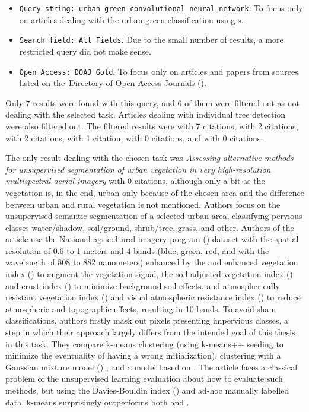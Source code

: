 \begin{itemize}
	\item \verb|Query string: urban green convolutional neural network|. To focus only on articles dealing with the urban green classification using s.
	\item \verb|Search field: All Fields|. Due to the small number of results, a more restricted query did not make sense.
	\item \verb|Open Access: DOAJ Gold|. To focus only on articles and papers from sources listed on the~Di\-rectory of Open Access Journals ().
\end{itemize}

\noindent Only 7 results were found with this query, and 6 of them were filtered out as not dealing with the selected task. Articles dealing with individual tree detection were also filtered out. The filtered results were \cite{tree-detection-uav-cnn} with 7 citations, \cite{cascaded-cnn-trees} with 2 citations, \cite{window-zooming-fruit} with 2 citations, \cite{urban-green-quantification} with 1 citation, \cite{urban-green-obesity} with 0 citations, and \cite{urban-green-contamination} with 0 citations.

The only result dealing with the chosen task was \textit{Assessing alternative methods for unsupervised segmentation of urban vegetation in very high-resolution multispectral aerial imagery} \cite{urban-green-unsupervised-aerial} with 0 citations, although only a bit as the vegetation is, in the end, urban only because of the chosen area and the difference between urban and rural vegetation is not mentioned. Authors focus on the unsupervised semantic segmentation of a selected urban area, classifying pervious classes water/shadow, soil/ground, shrub/tree, grass, and other. Authors of the article use the National agricultural imagery program () dataset with the spatial resolution of 0.6 to 1 meters and 4 bands (blue, green, red, and  with the wavelength of 808 to 882 nanometers) enhanced by the  and enhanced vegetation index () to augment the vegetation signal, the soil adjusted vegetation index () and crust index () to minimize background soil effects, and atmospherically resistant vegetation index () and visual atmospheric resistance index () to reduce atmospheric and topographic effects, resulting in 10 bands. To avoid sham classifications, authors firstly mask out pixels presenting impervious classes, a step in which their approach largely differs from the intended goal of this thesis in this task. They compare k-means clustering \cite{k-means} (using k-means++ seeding \cite{k-means-plusplus} to minimize the eventuality of having a wrong initialization), clustering with a Gaussian mixture model () \cite{gmm}, and a  model based on \cite{cnn-hs-unsupervised-fuzzy}. The article faces a classical problem of the unsupervised learning evaluation about how to evaluate such methods, but using the Davies-Bouldin index () \cite{dbi} and ad-hoc manually labelled data, k-means surprisingly outperforms both  and .

